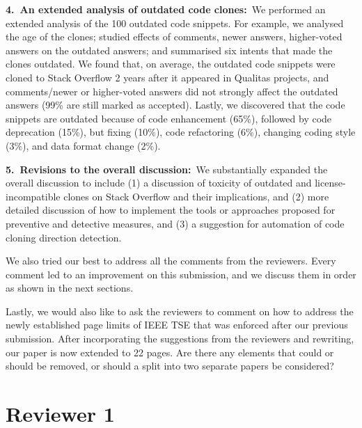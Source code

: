 \documentclass[a4paper,twoside,10pt]{reviewresponse}
\begin{document}
\textbf{4.~An extended analysis of outdated code clones:}~We performed an
extended analysis of the 100 outdated code snippets. For example, we analysed
the age of the clones; studied effects of comments, newer answers, higher-voted
answers on the outdated answers; and summarised six intents that made the
clones outdated. We found that, on average, the outdated code snippets were cloned to Stack Overflow
2 years after it appeared in Qualitas projects, and comments/newer or
higher-voted answers did not strongly affect the outdated answers (99\% are
still marked as accepted). Lastly, we discovered that the code snippets are outdated
because of code enhancement (65\%), followed by code deprecation (15\%), but
fixing (10\%), code refactoring (6\%), changing coding style (3\%), and data
format change (2\%).

\textbf{5.~Revisions to the overall discussion:}~We substantially expanded the
overall discussion to include (1) a discussion of toxicity of outdated and
license-incompatible clones on Stack Overflow and their implications, and (2)
more detailed discussion of how to implement the tools or approaches proposed
for preventive and detective measures, and (3) a suggestion for automation of
code cloning direction detection.

\clearpage
We also tried our best to address all the comments from the reviewers. Every
comment led to an improvement on this submission, and we discuss them in order as
shown in the next sections.

Lastly, we would also like to ask the reviewers to comment on how to address the
newly established page limits of IEEE TSE that was enforced after our previous
submission. After incorporating the suggestions from the reviewers and
rewriting, our paper is now extended to 22 pages. Are there any elements that
could or should be removed, or should a split into two separate papers be
considered?

\clearpage

\section{Reviewer 1}
\end{document}

